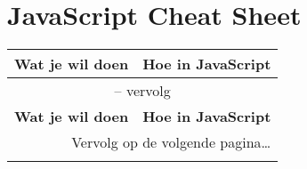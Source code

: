 \chapter{JavaScript Cheat Sheet}
{
\newcommand{\ENTRY}[2]{%
  \parbox{5cm}{\vskip2pt #1 \vskip2pt} &%
  \parbox{8cm}{{}} \\ \hline}

\begin{longtable}{||l|l||}



\hline \hline
 \textbf{Wat je wil doen} &
 \textbf{Hoe in JavaScript} \\
\hline
\endfirsthead


\multicolumn{2}{c}{{\tablename} \thetable{} -- vervolg} \\
\hline \hline
 \textbf{Wat je wil doen} &
 \textbf{Hoe in JavaScript} \\
\hline
\endhead


\multicolumn{2}{r}{{Vervolg op de volgende pagina\ldots}} \\
\endfoot


\hline \hline
\endlastfoot



\end{longtable}}
